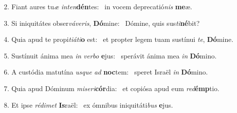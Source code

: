 2. Fiant aures tu\textit{æ} \textit{in}\textit{ten}\textbf{dén}tes: \ast\  in vocem deprecatió\textit{nis} \textbf{me}æ.\

3. Si iniquitátes obser\textit{vá}\textit{ve}\textit{ris}, \textbf{Dó}mine: \ast\  Dómine, quis sus\textit{ti}\textbf{né}bit?\

4. Quia apud te propi\textit{ti}\textit{á}\textit{ti}\textbf{o} est: \ast\  et propter legem tuam sustínui \textit{te}, \textbf{Dó}mine.\

5. Sustínuit ánima mea \textit{in} \textit{ver}\textit{bo} \textbf{e}jus: \ast\  sperávit ánima mea \textit{in} \textbf{Dó}mino.\

6. A custódia matutína \textit{us}\textit{que} \textit{ad} \textbf{noc}tem: \ast\  speret Israël \textit{in} \textbf{Dó}mino.\

7. Quia apud Dóminum \textit{mi}\textit{se}\textit{ri}\textbf{cór}dia: \ast\  et copiósa apud eum \textit{red}\textbf{émp}tio.\

8. Et ipse \textit{réd}\textit{i}\textit{met} \textbf{Is}raël: \ast\  ex ómnibus iniquitáti\textit{bus} \textbf{e}jus.\


